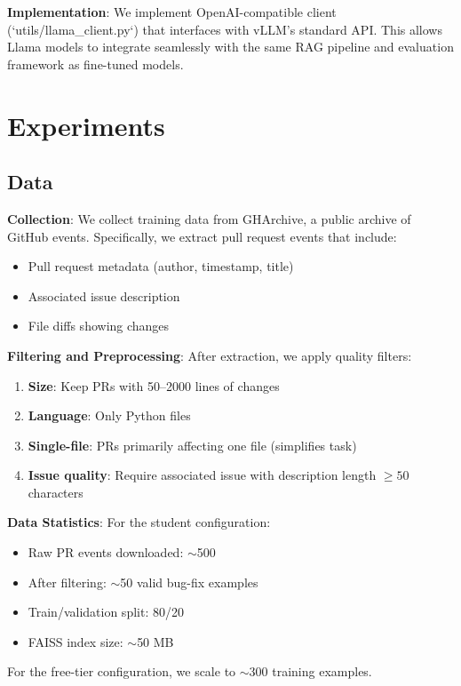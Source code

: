 \documentclass{article} %
\begin{document}
\textbf{Implementation}: We implement OpenAI-compatible client (`utils/llama_client.py`) that interfaces with vLLM's \citep{kwon2023vllm} standard API. This allows Llama models to integrate seamlessly with the same RAG pipeline and evaluation framework as fine-tuned models.

\section{Experiments}

\subsection{Data}

\textbf{Collection}: We collect training data from GHArchive, a public archive of GitHub events. Specifically, we extract pull request events that include:
\begin{itemize}
    \item Pull request metadata (author, timestamp, title)
    \item Associated issue description
    \item File diffs showing changes
\end{itemize}

\textbf{Filtering and Preprocessing}:
After extraction, we apply quality filters:
\begin{enumerate}
    \item \textbf{Size}: Keep PRs with 50--2000 lines of changes
    \item \textbf{Language}: Only Python files
    \item \textbf{Single-file}: PRs primarily affecting one file (simplifies task)
    \item \textbf{Issue quality}: Require associated issue with description length $\geq 50$ characters
\end{enumerate}

\textbf{Data Statistics}:
For the student configuration:
\begin{itemize}
    \item Raw PR events downloaded: $\sim$500
    \item After filtering: $\sim$50 valid bug-fix examples
    \item Train/validation split: 80/20
    \item FAISS index size: $\sim$50 MB
\end{itemize}

For the free-tier configuration, we scale to $\sim$300 training examples.
\end{document}
